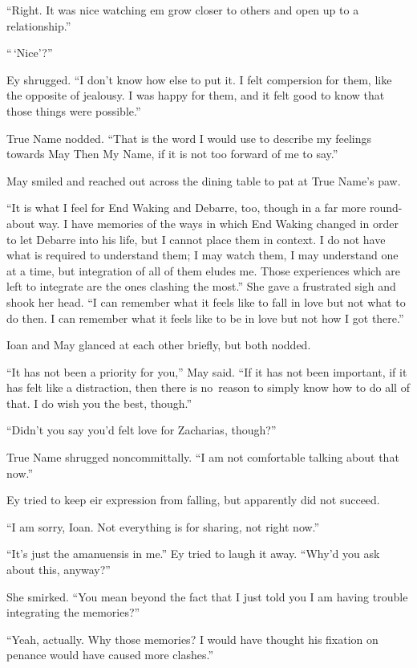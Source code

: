 ``Right. It was nice watching em grow closer to others and open up to a relationship.''

``\,`Nice'?''

Ey shrugged. ``I don't know how else to put it. I felt compersion for them, like the opposite of jealousy. I was happy for them, and it felt good to know that those things were possible.''

True Name nodded. ``That is the word I would use to describe my feelings towards May Then My Name, if it is not too forward of me to say.''

May smiled and reached out across the dining table to pat at True Name's paw.

``It is what I feel for End Waking and Debarre, too, though in a far more round-about way. I have memories of the ways in which End Waking changed in order to let Debarre into his life, but I cannot place them in context. I do not have what is required to understand them; I may watch them, I may understand one at a time, but integration of all of them eludes me. Those experiences which are left to integrate are the ones clashing the most.'' She gave a frustrated sigh and shook her head. ``I can remember what it feels like to fall in love but not what to do then. I can remember what it feels like to be in love but not how I got there.''

Ioan and May glanced at each other briefly, but both nodded.

``It has not been a priority for you,'' May said. ``If it has not been important, if it has felt like a distraction, then there is no\pagebreak\ reason to simply know how to do all of that. I do wish you the best, though.''

``Didn't you say you'd felt love for Zacharias, though?''

True Name shrugged noncommittally. ``I am not comfortable talking about that now.''

Ey tried to keep eir expression from falling, but apparently did not succeed.

``I am sorry, Ioan. Not everything is for sharing, not right now.''

``It's just the amanuensis in me.'' Ey tried to laugh it away. ``Why'd you ask about this, anyway?''

She smirked. ``You mean beyond the fact that I just told you I am having trouble integrating the memories?''

``Yeah, actually. Why those memories? I would have thought his fixation on penance would have caused more clashes.''

